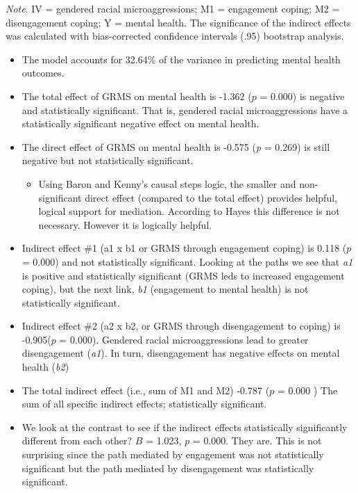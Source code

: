 \documentclass[
]{book}
\providecommand{\tightlist}{%
  \setlength{\itemsep}{0pt}\setlength{\parskip}{0pt}}
\begin{document}
\begin{longtable}[]{@{}
  >{\raggedright\arraybackslash}p{}@{}}
\toprule
\endhead
\bottomrule
\end{longtable}

\emph{Note}. IV = gendered racial microaggressions; M1 = engagement coping; M2 = disengagement coping; Y = mental health. The significance of the indirect effects was calculated with bias-corrected confidence intervals (.95) bootstrap analysis.

\begin{itemize}
\tightlist
\item
  The model accounts for 32.64\% of the variance in predicting mental health outcomes.
\item
  The total effect of GRMS on mental health is -1.362 (\(p\) = 0.000) is negative and statistically significant. That is, gendered racial microaggressions have a statistically significant negative effect on mental health.
\item
  The direct effect of GRMS on mental health is -0.575 (\emph{p} = 0.269) is still negative but not statistically significant.

  \begin{itemize}
  \tightlist
  \item
    Using Baron and Kenny's \citeyearpar{baron_moderator-mediator_1986} causal steps logic, the smaller and non-significant direct effect (compared to the total effect) provides helpful, logical support for mediation. According to Hayes \citeyearpar{hayes_introduction_2018} this difference is not necessary. However it is logically helpful.
  \end{itemize}
\item
  Indirect effect \#1 (a1 x b1 or GRMS through engagement coping) is 0.118 (\(p\) = 0.000) and not statistically significant. Looking at the paths we see that \emph{a1} is positive and statistically significant (GRMS leds to increased engagement coping), but the next link, \emph{b1} (engagement to mental health) is not statistically significant.
\item
  Indirect effect \#2 (a2 x b2, or GRMS through disengagement to coping) is -0.905(\(p\) = 0.000). Gendered racial microaggressions lead to greater disengagement (\emph{a1}). In turn, disengagement has negative effects on mental health (\emph{b2})
\item
  The total indirect effect (i.e., sum of M1 and M2) -0.787 (\(p\) = 0.000 ) The sum of all specific indirect effects; statistically significant.
\item
  We look at the contrast to see if the indirect effects statistically significantly different from each other? \(B\) = 1.023, \(p\) = 0.000. They are. This is not surprising since the path mediated by engagement was not statistically significant but the path mediated by disengagement was statistically significant.
\end{itemize}
\end{document}
